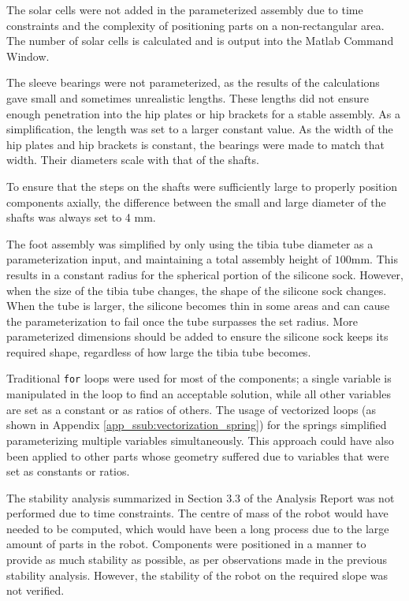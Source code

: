 The solar cells were not added in the parameterized assembly due to time constraints and the complexity of positioning parts on a non-rectangular area. The number of solar cells is calculated and is output into the Matlab Command Window.

The sleeve bearings were not parameterized, as the results of the calculations gave small and sometimes unrealistic lengths. These lengths did not ensure enough penetration into the hip plates or hip brackets for a stable assembly. As a simplification, the length was set to a larger constant value. As the width of the hip plates and hip brackets is constant, the bearings were made to match that width. Their diameters scale with that of the shafts.

To ensure that the steps on the shafts were sufficiently large to properly position components axially, the difference between the small and large diameter of the shafts was always set to 4 mm.

The foot assembly was simplified by only using the tibia tube diameter as a parameterization input, and maintaining a total assembly height of $100\text{mm}$. This results in a constant radius for the spherical portion of the silicone sock. However, when the size of the tibia tube changes, the shape of the silicone sock changes. When the tube is larger, the silicone becomes thin in some areas and can cause the parameterization to fail once the tube surpasses the set radius. More parameterized dimensions should be added to ensure the silicone sock keeps its required shape, regardless of how large the tibia tube becomes.

Traditional \texttt{for} loops were used for most of the components; a single variable is manipulated in the loop to find an acceptable solution, while all other variables are set as a constant or as ratios of others.
The usage of vectorized loops (as shown in Appendix \ref{app_ssub:vectorization_spring}) for the springs simplified parameterizing multiple variables simultaneously. This approach could have also been applied to other parts whose geometry suffered due to variables that were set as constants or ratios.

The stability analysis summarized in Section 3.3 of the Analysis Report was not performed due to time constraints. The centre of mass of the robot would have needed to be computed, which would have been a long process due to the large amount of parts in the robot. Components were positioned in a manner to provide as much stability as possible, as per observations made in the previous stability analysis. However, the stability of the robot on the required slope was not verified.

